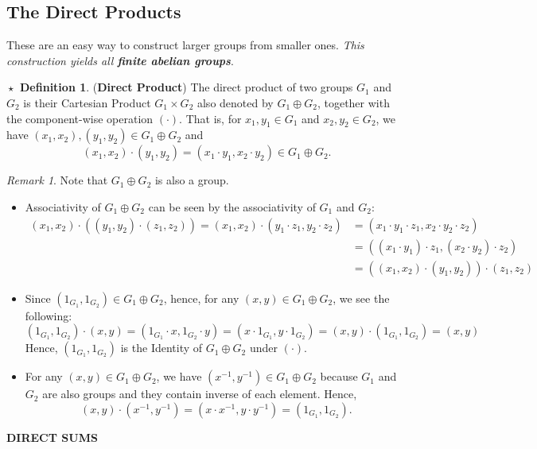 \documentclass{article}
\theoremstyle{definition}
\newtheorem{definition}{$\boxed{\star}$ Definition}
\theoremstyle{remark}
\newtheorem*{remark}{Remark}
\theoremstyle{definition}
\theoremstyle{definition}
\theoremstyle{definition}
\theoremstyle{proof}
\newcommand{\inv}[1]{#1^{-1}}
\begin{document}
\subsection{The Direct Products}
These are an easy way to construct larger groups from smaller ones. \emph{This construction yields all \textbf{finite abelian groups}}.

\hrulefill
\begin{definition}
	(\textbf{Direct Product}) The direct product of two groups $ G_1 $ and $ G_2 $ is their Cartesian Product $G_1 \times G_2 $ also denoted by $G_1 \oplus G_2$, together with the component-wise operation $ (\cdot) $. That is, for $ x_1,y_1 \in G_1 $ and $ x_2,y_2\in G_2 $, we have $ (x_1,x_2), (y_1,y_2) \in G_1\oplus G_2 $ and
	\[(x_1,x_2)\cdot (y_1,y_2) = (x_1\cdot y_1,x_2\cdot y_2) \in G_1\oplus G_2.\]
\end{definition}
\begin{remark}
	Note that $ G_1\oplus G_2 $ is also a group.
	\begin{itemize}
		\item{Associativity of $ G_1\oplus G_2 $ can be seen by the associativity of $ G_1 $ and $ G_2 $:
	\begin{equation*}
		\begin{split}
			(x_1,x_2)\cdot \left((y_1,y_2) \cdot (z_1,z_2) \right) = (x_1,x_2)\cdot (y_1\cdot z_1,y_2\cdot z_2) &= (x_1\cdot y_1\cdot z_1, x_2\cdot y_2\cdot z_2) \\
			&= ((x_1\cdot y_1)\cdot z_1, (x_2\cdot y_2)\cdot z_2)\\
			&= ((x_1,x_2)\cdot (y_1,y_2))\cdot (z_1,z_2)
		\end{split}
	\end{equation*}	
	}
\item{Since $ (1_{G_1}, 1_{G_2})\in G_1\oplus G_2$, hence, for any $ (x,y) \in G_1\oplus G_2 $, we see the following:
\[(1_{G_1}, 1_{G_2}) \cdot (x,y) = (1_{G_1}\cdot x, 1_{G_2} \cdot y) = (x\cdot 1_{G_1}, y\cdot 1_{G_2}) = (x,y)\cdot(1_{G_1}, 1_{G_2}) =(x,y)\]
Hence, $ (1_{G_1},1_{G_2}) $ is the Identity of $ G_1\oplus G_2 $ under $ (\cdot) $.
}
\item{For any $ (x,y)\in G_1 \oplus G_2$, we have $ (\inv{x},\inv{y}) \in G_1\oplus G_2$ because $ G_1 $ and $ G_2 $ are also groups and they contain inverse of each element. Hence, 
\[(x,y)\cdot (\inv{x},\inv{y}) = (x\cdot \inv{x}, y\cdot\inv{y}) = (1_{G_1}, 1_{G_2}).\]
}
	\end{itemize}
\end{remark}
\hrulefill
\textbf{DIRECT SUMS}
\hrulefill
\end{document}

